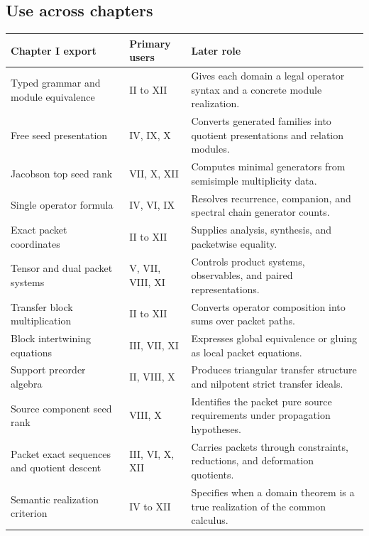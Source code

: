 \subsection{Use across chapters}
\begin{center}
\begin{longtable}{@{}>{\raggedright\arraybackslash}p{}>{\raggedright\arraybackslash}p{}>{\raggedright\arraybackslash}p{}@{}}
\toprule
\textbf{Chapter I export} & \textbf{Primary users} & \textbf{Later role}\\
\midrule
\endhead
Typed grammar and module equivalence & II to XII & Gives each domain a legal operator syntax and a concrete module realization.\\
Free seed presentation & IV, IX, X & Converts generated families into quotient presentations and relation modules.\\
Jacobson top seed rank & VII, X, XII & Computes minimal generators from semisimple multiplicity data.\\
Single operator formula & IV, VI, IX & Resolves recurrence, companion, and spectral chain generator counts.\\
Exact packet coordinates & II to XII & Supplies analysis, synthesis, and packetwise equality.\\
Tensor and dual packet systems & V, VII, VIII, XI & Controls product systems, observables, and paired representations.\\
Transfer block multiplication & II to XII & Converts operator composition into sums over packet paths.\\
Block intertwining equations & III, VII, XI & Expresses global equivalence or gluing as local packet equations.\\
Support preorder algebra & II, VIII, X & Produces triangular transfer structure and nilpotent strict transfer ideals.\\
Source component seed rank & VIII, X & Identifies the packet pure source requirements under propagation hypotheses.\\
Packet exact sequences and quotient descent & III, VI, X, XII & Carries packets through constraints, reductions, and deformation quotients.\\
Semantic realization criterion & IV to XII & Specifies when a domain theorem is a true realization of the common calculus.\\
\bottomrule
\end{longtable}
\end{center}


